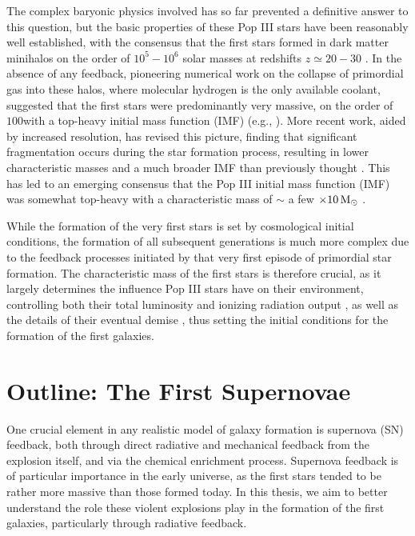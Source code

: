 \documentclass[../thesis.tex]{subfiles}
\begin{document}
The complex baryonic physics involved has so far prevented a definitive answer to this question, but the basic properties of these Pop III stars have been reasonably well established, with the consensus that the first stars formed in dark matter minihalos on the order of $10^5-10^6$ solar masses at redshifts $z \simeq 20-30$ \citep{CouchmanRees1986,   HaimanThoulLoeb1996, Tegmarketal1997}.  
In the absence of any feedback, pioneering numerical work on the collapse of primordial gas into these halos, where molecular hydrogen is the only available coolant, suggested that the first stars were predominantly very massive, on the order of $100$\msun with a top-heavy initial mass function (IMF) (e.g., \citealt{BrommCoppiLarson1999, BrommCoppiLarson2002, AbelBryanNorman2002, BrommLarson2004, Yoshidaetal2006, OSheaNorman2007}).  
More recent work, aided by increased resolution, has revised this picture, finding that significant fragmentation occurs during the star formation process, resulting in lower characteristic masses and a much broader IMF than previously thought \citep{StacyGreifBromm2010,Clarketal2011a,Clarketal2011b,Greifetal2011,Greifetal2012,StacyBromm2013,Hiranoetal2014,Hosokawaetal2015}. This has led to an emerging consensus that the Pop III initial mass function (IMF) was somewhat top-heavy with a characteristic mass of $\sim$ a few $\times 10\,\mathrm{M}_{\odot}$ \citep{Bromm2013}. 

While the formation of the very first stars is set by cosmological initial conditions, the formation of all subsequent generations is much more complex due to the feedback processes initiated by that very first episode of primordial star formation.
The characteristic mass of the first stars is therefore crucial, as it largely determines the influence Pop III stars have on their environment, controlling both their total luminosity and ionizing radiation output \citep{Schaerer2002}, as well as the details of their eventual demise \citep{Hegeretal2003,HegerWoosley2010,MaederMeynet2012}, thus setting the initial conditions for the formation of the first galaxies.

\section{Outline: The First Supernovae}
One crucial element in any realistic model of galaxy formation is supernova (SN) feedback, both through direct radiative and mechanical feedback from the explosion itself, and via the chemical enrichment process. 
Supernova feedback is of particular importance in the early universe, as the first stars tended to be rather more massive than those formed today. 
In this thesis, we aim to better understand the role these violent explosions play in the formation of the first galaxies, particularly through radiative feedback.
\end{document}
